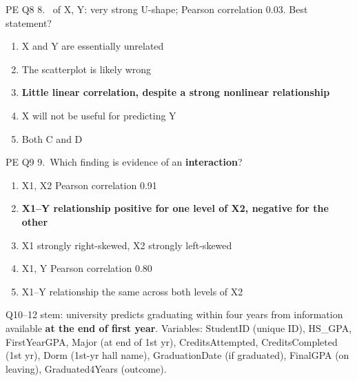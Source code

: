 \begin{qbox}{PE Q8}
8.~ of X, Y: very strong U-shape; Pearson correlation 0.03. Best statement?
\begin{enumerate}[label=\alph*.]
\item X and Y are essentially unrelated
\item The scatterplot is likely wrong
\item {\color{keyc}\bfseries Little linear correlation, despite a strong nonlinear relationship}
\item X will not be useful for predicting Y
\item Both C and D
\end{enumerate}
\end{qbox}

\begin{qbox}{PE Q9}
9.~Which  finding is evidence of an \textbf{interaction}?
\begin{enumerate}[label=\alph*.]
\item X1, X2 Pearson correlation 0.91
\item {\color{keyc}\bfseries X1--Y relationship positive for one level of X2, negative for the other}
\item X1 strongly right-skewed, X2 strongly left-skewed
\item X1, Y Pearson correlation 0.80
\item X1--Y relationship the same across both levels of X2
\end{enumerate}
\end{qbox}

Q10--12 stem: university predicts graduating within four years from information available \textbf{at the end of first year}.
Variables: StudentID (unique ID), HS\_GPA, FirstYearGPA, Major (at end of 1st yr), CreditsAttempted, CreditsCompleted (1st yr), Dorm (1st-yr hall name), GraduationDate (if graduated), FinalGPA (on leaving), Graduated4Years (outcome).

